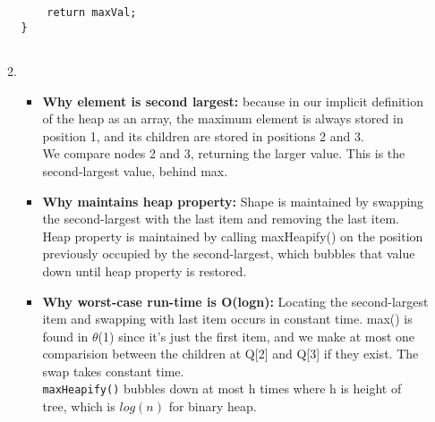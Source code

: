\documentclass{article}
\begin{document}
\begin{enumerate}
\begin{enumerate}
\begin{lstlisting}
	return maxVal;
}
    		
    	\end{lstlisting}
    	
    	\item 
    	\begin{itemize}
    		\item \textbf{Why element is second largest:} because in our implicit definition of the heap as an array, the maximum element is always stored in position 1, and its children are stored in positions 2 and 3. \\
    		
    		We compare nodes 2 and 3, returning the larger value. This is the second-largest value, behind max. \\
    		\item \textbf{Why maintains heap property:} Shape is maintained by swapping the second-largest with the last item and removing the last item. Heap property is maintained by calling maxHeapify() on the position previously occupied by the second-largest, which bubbles that value down until heap property is restored. \\
    		\item \textbf{Why worst-case run-time is O(logn):} Locating the second-largest item and swapping with last item occurs in constant time. max() is found in $\theta$(1) since it's just the first item, and we make at most one comparision between the children at Q[2] and Q[3] if they exist. The swap takes constant time. \\
    		
    		 \texttt{maxHeapify()} bubbles down at most h times where h is height of tree, which is $log(n)$ for binary heap. \\
    	\end{itemize}
    	
	\end{enumerate}	
\end{enumerate}
\end{document}

